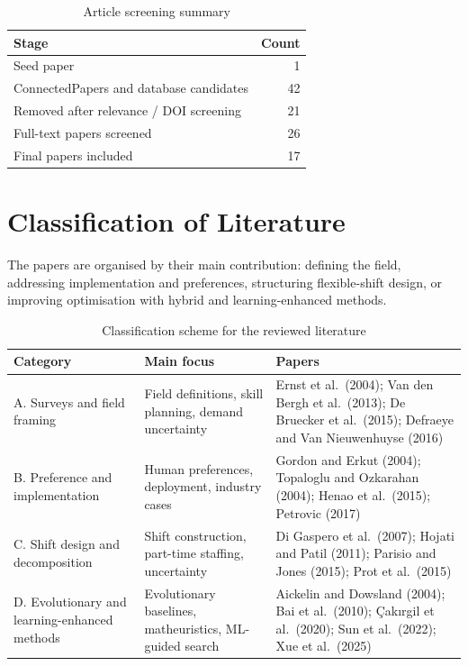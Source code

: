 \documentclass[12pt]{article}
\begin{document}
\begin{table}[H]
\centering
\caption{Article screening summary}
\label{tab:screening}
\begin{tabular}{lr}
\toprule
Stage & Count \\
\midrule
Seed paper & 1 \\
ConnectedPapers and database candidates & 42 \\
Removed after relevance / DOI screening & 21 \\
Full-text papers screened & 26 \\
Final papers included & 17 \\
\bottomrule
\end{tabular}
\end{table}

\section{Classification of Literature}

The papers are organised by their main contribution: defining the field, addressing implementation and preferences, structuring flexible-shift design, or improving optimisation with hybrid and learning-enhanced methods.

\begin{table}[H]
\centering
\caption{Classification scheme for the reviewed literature}
\label{tab:classification}
\small
\begin{tabularx}{\textwidth}{p{}p{}Y}
\toprule
Category & Main focus & Papers \\
\midrule
A. Surveys and field framing & Field definitions, skill planning, demand uncertainty & Ernst et al.\ (2004); Van den Bergh et al.\ (2013); De Bruecker et al.\ (2015); Defraeye and Van Nieuwenhuyse (2016) \\
B. Preference and implementation & Human preferences, deployment, industry cases & Gordon and Erkut (2004); Topaloglu and Ozkarahan (2004); Henao et al.\ (2015); Petrovic (2017) \\
C. Shift design and decomposition & Shift construction, part-time staffing, uncertainty & Di Gaspero et al.\ (2007); Hojati and Patil (2011); Parisio and Jones (2015); Prot et al.\ (2015) \\
D. Evolutionary and learning-enhanced methods & Evolutionary baselines, matheuristics, ML-guided search & Aickelin and Dowsland (2004); Bai et al.\ (2010); \c{C}ak{\i}rgil et al.\ (2020); Sun et al.\ (2022); Xue et al.\ (2025) \\
\bottomrule
\end{tabularx}
\end{table}
\end{document}
